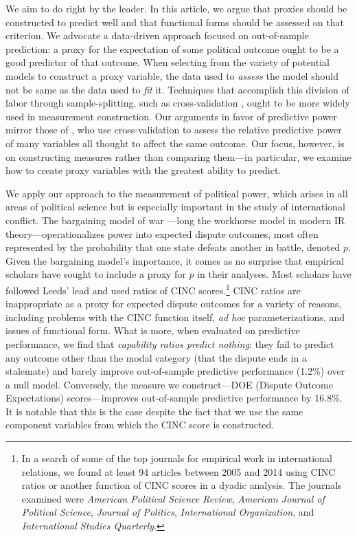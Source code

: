 We aim to do right by the leader. 
In this article, we argue that proxies should be constructed to predict well and that functional forms should be assessed on that criterion.
We advocate a data-driven approach focused on out-of-sample prediction: a proxy for the expectation of some political outcome ought to be a good predictor of that outcome.
When selecting from the variety of potential models to construct a proxy variable, the data used to \emph{assess} the model should not be same as the data used to \emph{fit} it.
Techniques that accomplish this division of labor through sample-splitting, such as cross-validation \citep{Efron:2012es}, ought to be more widely used in measurement construction.
Our arguments in favor of predictive power mirror those of \citet{Hill:2014ki}, who use cross-validation to assess the relative predictive power of many variables all thought to affect the same outcome.
Our focus, however, is on constructing measures rather than comparing them---in particular, we examine how to create proxy variables with the greatest ability to predict.

We apply our approach to the measurement of political power, which arises in all areas of political science but is especially important in the study of international conflict.
The bargaining model of war \citep{fearon1995}---long the workhorse model in modern IR theory---operationalizes power into expected dispute outcomes, most often represented by the probability that one state defeats another in battle, denoted $p$.
Given the bargaining model's importance, it comes as no surprise that empirical scholars have sought to include a proxy for $p$ in their analyses.
Most scholars have followed Leeds' lead and used ratios of CINC scores.\footnote{
  \label{fn:replications}
  In a search of some of the top journals for empirical work in international relations, we found at least 94 articles between 2005 and 2014 using CINC ratios or another function of CINC scores in a dyadic analysis.
  The journals examined were \emph{American Political Science Review}, \emph{American Journal of Political Science}, \emph{Journal of Politics}, \emph{International Organization}, and \emph{International Studies Quarterly}.
}
CINC ratios are inappropriate as a proxy for expected dispute outcomes for a variety of reasons, including problems with the CINC function itself, \emph{ad hoc} parameterizations, and issues of functional form.
What is more, when evaluated on predictive performance, we find that \emph{capability ratios predict nothing}: they fail to predict any outcome other than the modal category (that the dispute ends in a stalemate) and barely improve out-of-sample predictive performance (1.2\%) over a null model.
Conversely, the measure we construct---DOE (Dispute Outcome Expectations) scores---improves out-of-sample predictive performance by 16.8\%.
It is notable that this is the case despite the fact that we use the same component variables from which the CINC score is constructed.

